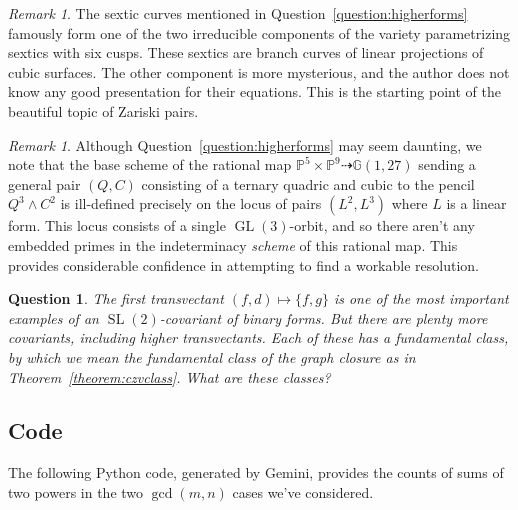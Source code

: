 \documentclass[12pt]{article}
\theoremstyle{plain}
\newtheorem{question}[theorem]{Question}
\theoremstyle{remark}
\newtheorem{remark}[theorem]{Remark}
\renewcommand{\P}{\mathbb{P}}
\newcommand{\GL}{\operatorname{GL}}
\newcommand{\SL}{\operatorname{SL}}
\newcommand{\G}{\mathbb{G}}
\begin{document}
\begin{remark}
    \label{remark:ZariskiPairs} The sextic curves mentioned in Question~\ref{question:higherforms} famously form one of the two irreducible components of the variety parametrizing sextics with six cusps.  These sextics are branch curves of linear projections of cubic surfaces.  The other component is more mysterious, and the author does not know any good presentation for their equations.  This is the starting point of the beautiful topic of Zariski pairs.
\end{remark}

\begin{remark}
    \label{remark:notdaunting} Although Question~\ref{question:higherforms} may seem daunting, we note that the base scheme of the rational map $\P^{5} \times \P^{9} \dashrightarrow \G(1,27)$ sending a general pair $(Q,C)$ consisting of a ternary quadric and cubic to the pencil $Q^{3} \wedge C^{2}$ is ill-defined precisely on the locus of pairs $(L^{2},L^{3})$ where $L$ is a linear form.  This locus consists of a single $\GL(3)$-orbit, and so there aren't any embedded primes in the indeterminacy {\sl scheme} of this rational map.  This provides considerable confidence in attempting to find a workable resolution.
\end{remark}

\begin{question}
    \label{question:fundamentalclassofacovariant}  The first transvectant $(f,d) \mapsto \{f,g\}$ is one of the most important examples of an $\SL(2)$-covariant of binary forms.  But there are plenty more covariants, including higher transvectants.  Each of these has a fundamental class, by which we mean the fundamental class of the graph closure as in Theorem~\ref{theorem:czvclass}.  What are these classes?
\end{question}


\subsection{Code}

The following Python code, generated by Gemini, provides the counts of sums of two powers in the two $\gcd(m,n)$ cases we've considered.
\end{document}
